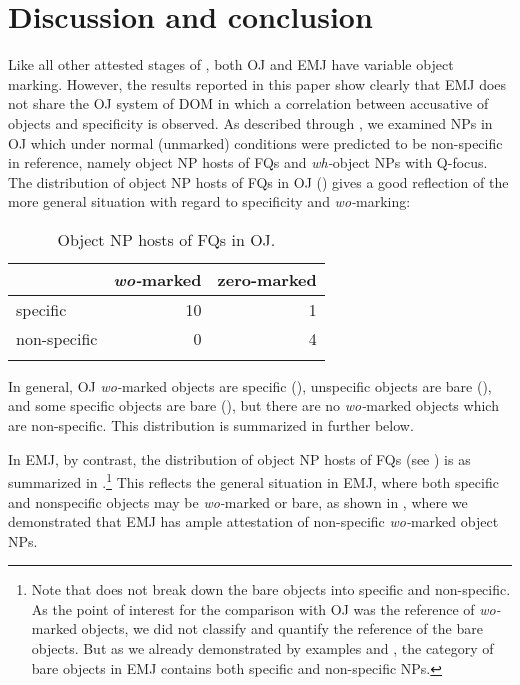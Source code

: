 \documentclass[output=paper]{LSP/langsci}
\begin{document}
\section{Discussion and conclusion}
\label{07-sec:4}

Like all other attested stages of , both OJ   and EMJ have variable object marking. However, the results reported in this paper show clearly that EMJ does not share the OJ   system of DOM in which a correlation between accusative  of objects and specificity is observed. As described through , we examined NPs in OJ   which under normal (unmarked) conditions were predicted to be non-specific in reference, namely object NP hosts of FQs and\textit{ wh-}object NPs with Q-focus. The distribution of object NP hosts of FQs in OJ   () gives a good reflection of the more general situation with regard to specificity and \textit{wo-}marking: 

\begin{table}
	\caption{Object NP hosts of FQs in OJ.}
	\begin{tabularx}{.75\textwidth}{ Q r  r  }
\lsptoprule
 & \textit{wo-}marked & zero-marked\\\midrule
 specific & 10 & 1\\
 non-specific & 0 & 4\\
\lspbottomrule
	\end{tabularx}
	\label{07-fr-tab:1}
\end{table}

In general, OJ   \textit{wo-}marked objects are specific (\eg {}), unspecific objects are bare (\eg {}), and some specific objects are bare (\eg {}), but there are no \textit{wo-}marked objects which are non-specific. This distribution is summarized in  further below. 

In EMJ, by contrast, the distribution of object NP hosts of FQs (see ) is as summarized in .\footnote{Note that  does not break down the bare objects into specific and non-specific. As the point of interest for the comparison with OJ   was the reference of \textit{wo-}marked objects, we did not classify and quantify the reference of the bare objects. But as we already demonstrated by examples   and , the category of bare objects in EMJ contains both specific and non-specific NPs.} This reflects the general situation in EMJ, where both specific and nonspecific objects may be \textit{wo-}marked or bare, as shown in , where we demonstrated that EMJ has ample attestation of non-specific \textit{wo-}marked object NPs.
\end{document}

